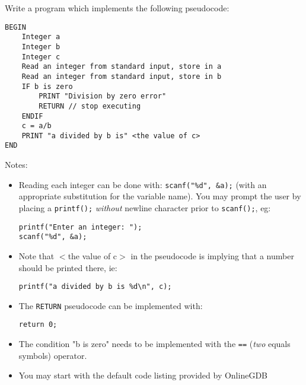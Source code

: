 \documentclass{lab}
\begin{document}
\begin{task}{}{}
Write a program which implements the following pseudocode:

\begin{lstlisting}[style=pseudo]
BEGIN 
	Integer a 
	Integer b
	Integer c
	Read an integer from standard input, store in a
	Read an integer from standard input, store in b
	IF b is zero
		PRINT "Division by zero error"
		RETURN // stop executing
	ENDIF
	c = a/b
	PRINT "a divided by b is" <the value of c>
END
\end{lstlisting}

Notes:

\begin{itemize}
\item Reading each integer can be done with: \texttt{scanf("\%d", \&a);} (with an appropriate substitution for the variable name). You may prompt the user by placing a \texttt{printf();} \textit{without} newline character prior to \texttt{scanf();}, eg:

\begin{lstlisting}[style=CStyle]
printf("Enter an integer: ");
scanf("%d", &a);
\end{lstlisting}

\item Note that $<$the value of c$>$ in the pseudocode is implying that a number should be printed there, ie:

\begin{lstlisting}[style=CStyle]
printf("a divided by b is %d\n", c);
\end{lstlisting}


\item The \texttt{RETURN} pseudocode can be implemented with:
\begin{lstlisting}[style=CStyle]
return 0;
\end{lstlisting}

\item The condition "b is zero" needs to be implemented with the \texttt{==} (\textit{two} equals symbols) operator.

\item You may start with the default code listing provided by OnlineGDB
\end{itemize}
\end{task}
\end{document}
